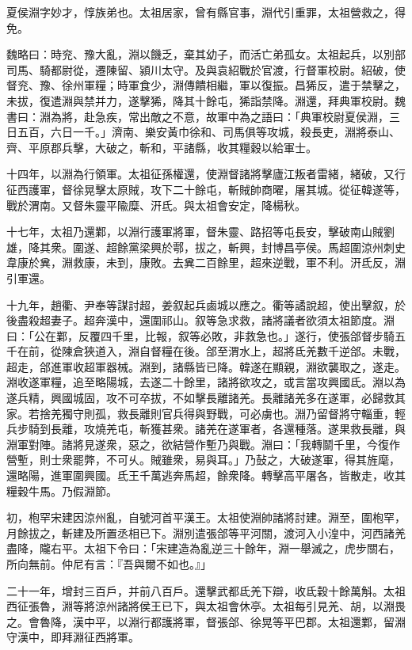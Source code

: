 
\begin{pinyinscope}
夏侯淵字妙才，惇族弟也。太祖居家，曾有縣官事，淵代引重罪，太祖營救之，得免。

魏略曰：時兖、豫大亂，淵以饑乏，棄其幼子，而活亡弟孤女。太祖起兵，以別部司馬、騎都尉從，遷陳留、潁川太守。及與袁紹戰於官渡，行督軍校尉。紹破，使督兖、豫、徐州軍糧；時軍食少，淵傳饋相繼，軍以復振。昌狶反，遣于禁擊之，未拔，復遣淵與禁并力，遂擊狶，降其十餘屯，狶詣禁降。淵還，拜典軍校尉。魏書曰：淵為將，赴急疾，常出敵之不意，故軍中為之語曰：「典軍校尉夏侯淵，三日五百，六日一千。」濟南、樂安黃巾徐和、司馬俱等攻城，殺長吏，淵將泰山、齊、平原郡兵擊，大破之，斬和，平諸縣，收其糧穀以給軍士。

十四年，以淵為行領軍。太祖征孫權還，使淵督諸將擊廬江叛者雷緒，緒破，又行征西護軍，督徐晃擊太原賊，攻下二十餘屯，斬賊帥商曜，屠其城。從征韓遂等，戰於渭南。又督朱靈平隃糜、汧氐。與太祖會安定，降楊秋。

十七年，太祖乃還鄴，以淵行護軍將軍，督朱靈、路招等屯長安，擊破南山賊劉雄，降其衆。圍遂、超餘黨梁興於鄠，拔之，斬興，封博昌亭侯。馬超圍涼州刺史韋康於兾，淵救康，未到，康敗。去兾二百餘里，超來逆戰，軍不利。汧氐反，淵引軍還。

十九年，趙衢、尹奉等謀討超，姜叙起兵鹵城以應之。衢等譎說超，使出擊叙，於後盡殺超妻子。超奔漢中，還圍祁山。叙等急求救，諸將議者欲須太祖節度。淵曰：「公在鄴，反覆四千里，比報，叙等必敗，非救急也。」遂行，使張郃督步騎五千在前，從陳倉狹道入，淵自督糧在後。郃至渭水上，超將氐羌數千逆郃。未戰，超走，郃進軍收超軍器械。淵到，諸縣皆已降。韓遂在顯親，淵欲襲取之，遂走。淵收遂軍糧，追至略陽城，去遂二十餘里，諸將欲攻之，或言當攻興國氐。淵以為遂兵精，興國城固，攻不可卒拔，不如擊長離諸羌。長離諸羌多在遂軍，必歸救其家。若捨羌獨守則孤，救長離則官兵得與野戰，可必虜也。淵乃留督將守輜重，輕兵步騎到長離，攻燒羌屯，斬獲甚衆。諸羌在遂軍者，各還種落。遂果救長離，與淵軍對陣。諸將見遂衆，惡之，欲結營作塹乃與戰。淵曰：「我轉鬬千里，今復作營塹，則士衆罷弊，不可乆。賊雖衆，易與耳。」乃鼔之，大破遂軍，得其旌麾，還略陽，進軍圍興國。氐王千萬逃奔馬超，餘衆降。轉擊高平屠各，皆散走，收其糧穀牛馬。乃假淵節。

初，枹罕宋建因涼州亂，自號河首平漢王。太祖使淵帥諸將討建。淵至，圍枹罕，月餘拔之，斬建及所置丞相已下。淵別遣張郃等平河關，渡河入小湟中，河西諸羌盡降，隴右平。太祖下令曰：「宋建造為亂逆三十餘年，淵一舉滅之，虎步關右，所向無前。仲尼有言：『吾與爾不如也。』」

二十一年，增封三百戶，并前八百戶。還擊武都氐羌下辯，收氐穀十餘萬斛。太祖西征張魯，淵等將涼州諸將侯王已下，與太祖會休亭。太祖每引見羌、胡，以淵畏之。會魯降，漢中平，以淵行都護將軍，督張郃、徐晃等平巴郡。太祖還鄴，留淵守漢中，即拜淵征西將軍。


\end{pinyinscope}
